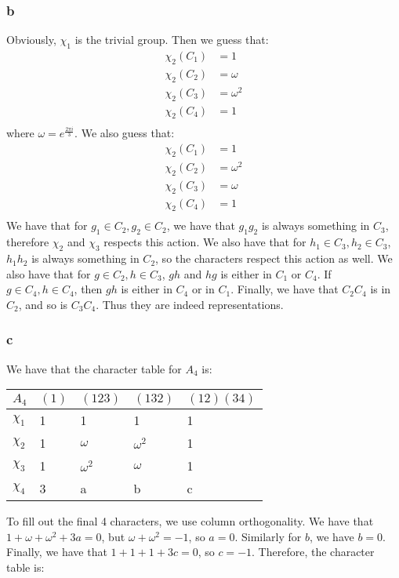 \documentclass[]{article}
\begin{document}
\subsubsection*{b}
Obviously, $\chi_1$ is the trivial group. Then we guess that:
\begin{align*}
	\chi_2(C_1) &= 1\\
	\chi_2(C_2) &= \omega\\
	\chi_2(C_3) &= \omega^2\\
	\chi_2(C_4) &= 1\\
\end{align*}
where $\omega = e^{\frac{2 \pi i}{3}}$.
We also guess that:
\begin{align*}
	\chi_2(C_1) &= 1\\
	\chi_2(C_2) &= \omega^2\\
	\chi_2(C_3) &= \omega\\
	\chi_2(C_4) &= 1\\
\end{align*}
We have that for $g_1 \in C_2, g_2 \in C_2$, we have that $g_1 g_2$ is always something in $C_3$, therefore $\chi_2$ and $\chi_3$ respects this action. We also have that for $h_1 \in C_3, h_2 \in C_3$, $h_1 h_2$ is always something in $C_2$, so the characters respect this action as well. We also have that for $g \in C_2, h \in C_3$, $gh$ and $hg$ is either in $C_1$ or $C_4$. If $g \in C_4, h \in C_4$, then $gh$ is either in $C_4$ or in $C_1$. Finally, we have that $C_2 C_4$ is in $C_2$, and so is $C_3 C_4$. Thus they are indeed representations. 

\subsubsection*{c}
We have that the character table for $A_4$ is:
\begin{table}[h!]
	\centering
	\begin{tabular}{|l|l|l|l|l|}
		\hline
		$A_4$    & $(1)$ & $(123)$    & $(132)$    & $(12)(34)$ \\ \hline
		$\chi_1$ & 1     & 1          & 1          & 1          \\ \hline
		$\chi_2$ & 1     & $\omega$   & $\omega^2$ & 1          \\ \hline
		$\chi_3$ & 1     & $\omega^2$ & $\omega$   & 1          \\ \hline
		$\chi_4$ & 3     & a          & b          & c         \\ \hline
	\end{tabular}
\end{table}
To fill out the final 4 characters, we use column orthogonality. We have that $1 + \omega + \omega^2 + 3a = 0$, but $\omega + \omega^2 = -1$, so $a = 0$. Similarly for $b$, we have $b = 0$. Finally, we have that $1 + 1 + 1 + 3c = 0$, so $c = -1$. Therefore, the character table is:
\end{document}

